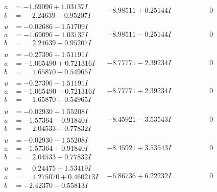 \documentclass[1p]{elsarticle_modified}
\theoremstyle{definition}
\begin{document}
$$\begin{array}{c|c|c}
\begin{aligned}
a &= -1.69096 + 1.03137 I \\
b &= \phantom{-}2.24639 - 0.95207 I\end{aligned}
 & -8.98511 + 0.25144 I & \phantom{-0.000000 } 0 \\ \hline\begin{aligned}
u &= -0.02686 - 1.51709 I \\
a &= -1.69096 - 1.03137 I \\
b &= \phantom{-}2.24639 + 0.95207 I\end{aligned}
 & -8.98511 - 0.25144 I & \phantom{-0.000000 } 0 \\ \hline\begin{aligned}
u &= -0.27396 + 1.51191 I \\
a &= -1.065490 + 0.721316 I \\
b &= \phantom{-}1.65870 - 0.54965 I\end{aligned}
 & -8.77771 - 2.39234 I & \phantom{-0.000000 } 0 \\ \hline\begin{aligned}
u &= -0.27396 - 1.51191 I \\
a &= -1.065490 - 0.721316 I \\
b &= \phantom{-}1.65870 + 0.54965 I\end{aligned}
 & -8.77771 + 2.39234 I & \phantom{-0.000000 } 0 \\ \hline\begin{aligned}
u &= -0.02930 + 1.55208 I \\
a &= -1.57364 - 0.91840 I \\
b &= \phantom{-}2.04533 + 0.77832 I\end{aligned}
 & -8.45921 - 3.53543 I & \phantom{-0.000000 } 0 \\ \hline\begin{aligned}
u &= -0.02930 - 1.55208 I \\
a &= -1.57364 + 0.91840 I \\
b &= \phantom{-}2.04533 - 0.77832 I\end{aligned}
 & -8.45921 + 3.53543 I & \phantom{-0.000000 } 0 \\ \hline\begin{aligned}
u &= \phantom{-}0.24475 + 1.53419 I \\
a &= \phantom{-}1.275070 + 0.460213 I \\
b &= -2.42370 - 0.55813 I\end{aligned}
 & -6.86736 + 6.22232 I & \phantom{-0.000000 } 0 \\ \hline\begin{aligned}

\end{aligned}
\end{array}$$
\end{document}
